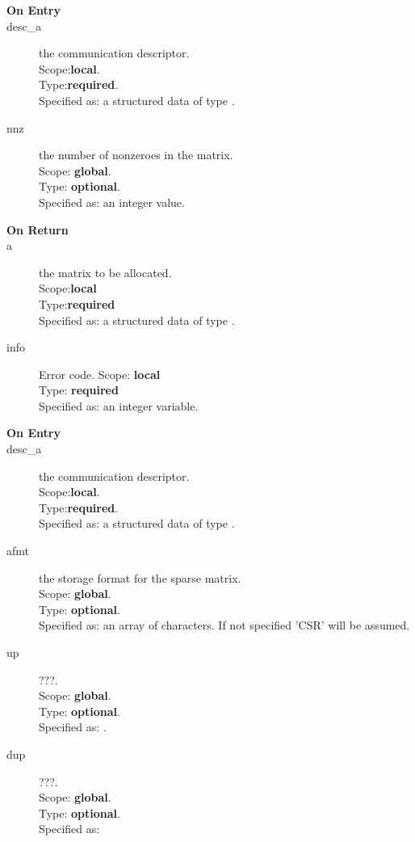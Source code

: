 %
%


\begin{description}
\item[\bf On Entry]
\item[desc\_a] the communication descriptor.\\
Scope:{\bf local}.\\
Type:{\bf required}.\\
Specified as: a structured data of type \descdata.
\item[nnz] the number of nonzeroes in the matrix.\\
Scope: {\bf global}.\\
Type: {\bf optional}.\\
Specified as: an integer value.
\end{description}

\begin{description}
\item[\bf On Return]
\item[a] the matrix to be allocated.\\
Scope:{\bf local}\\
Type:{\bf required}\\
Specified as: a structured data of type \spdata.
\item[info] Error code.
Scope: {\bf local} \\
Type: {\bf required}\\
Specified as: an integer variable.
\end{description}



%
%


\begin{description}
\item[\bf On Entry]
\item[desc\_a] the communication descriptor.\\
Scope:{\bf local}.\\
Type:{\bf required}.\\
Specified as: a structured data of type \descdata.
\item[afmt] the storage format for the sparse matrix.\\
Scope: {\bf global}.\\
Type: {\bf optional}.\\
Specified as: an array of characters. If not specified 'CSR' will be assumed.
\item[up] ???.\\
Scope: {\bf global}.\\
Type: {\bf optional}.\\
Specified as: .
\item[dup] ???.\\
Scope: {\bf global}.\\
Type: {\bf optional}.\\
Specified as: 
\end{description}

